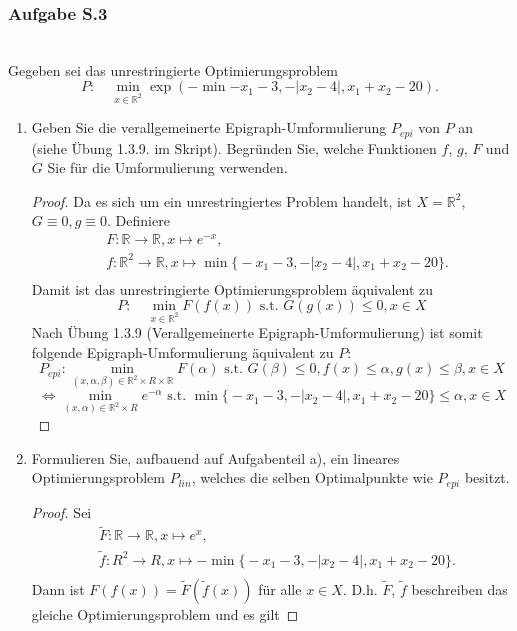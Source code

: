 \documentclass[12pt]{extreport} %
\newcommand{\R}{\mathbb{R}}
\theoremstyle{named}
\theoremstyle{nnamed}
\theoremstyle{itshape}
\theoremstyle{normal}
\begin{document}
\subsubsection{Aufgabe S.3} ~\\
Gegeben sei das unrestringierte Optimierungsproblem
$$ P : \quad \min_{x \in \R^2} \exp \left(- \min{- x_1 - 3, -\left|x_2 - 4\right|, x_1 + x_2 - 20} \right).$$
\begin{enumerate}
	\item Geben Sie die verallgemeinerte Epigraph-Umformulierung $P_{epi}$ von $P$ an (siehe Übung 1.3.9. im Skript). Begründen Sie, welche Funktionen $f$, $g$, $F$ und $G$ Sie für die Umformulierung verwenden.
		\begin{proof}
			Da es sich um ein unrestringiertes Problem handelt, ist $X = \R^2$, $G \equiv 0, g \equiv 0$. Definiere
			\begin{align*}
				& F: \R \rightarrow \R, x \mapsto e^{-x}, \\
				& f: \R^2 \rightarrow \R, x \mapsto \min\big\{- x_1 - 3, -\left|x_2 - 4\right|, x_1 + x_2 - 20\big\}. \\
			\end{align*}
			Damit ist das unrestringierte Optimierungsproblem äquivalent zu
			$$ P : \quad \min_{x \in \R^2} F(f(x)) \text{ s.t. } G(g(x)) \leq 0, x \in X $$
			Nach Übung 1.3.9 (Verallgemeinerte Epigraph-Umformulierung) ist somit folgende Epigraph-Umformulierung äquivalent zu $P$:
			$$ P_{epi}: \min_{(x, \alpha, \beta) \in \R^2 \times R \times \R} F(\alpha) \text{ s.t. } G(\beta) \leq 0, f(x) \leq \alpha, g(x) \leq \beta, x \in X $$
			$$ \iff \min_{(x, \alpha) \in \R^2 \times R} e^{-\alpha} \text{ s.t. } \min\big\{- x_1 - 3, -\left|x_2 - 4\right|, x_1 + x_2 - 20\big\} \leq \alpha, x \in X $$
		\end{proof}
	\item Formulieren Sie, aufbauend auf Aufgabenteil a), ein lineares Optimierungsproblem $P_{lin}$, welches die selben Optimalpunkte wie $P_{epi}$ besitzt.
		\begin{proof}
			Sei
			\begin{align*}
				& \tilde{F}: \R \rightarrow \R, x \mapsto e^{x}, \\
				&\tilde{f}: R^2 \rightarrow R, x \mapsto -\min\big\{- x_1 - 3, -\left|x_2 - 4\right|, x_1 + x_2 - 20\big\}. \\
			\end{align*}
			Dann ist $F(f(x)) = \tilde{F}(\tilde{f}(x))$ für alle $x \in X$. D.h. $\tilde{F}$, $\tilde{f}$ beschreiben das gleiche Optimierungsproblem und es gilt

\end{proof}
\end{enumerate}
\end{document}
